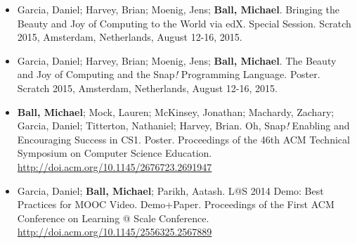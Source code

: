 \begin{itemize}
    \item{Garcia, Daniel; Harvey, Brian; Moenig, Jens; \textbf{Ball, Michael}. Bringing the Beauty and Joy of Computing to the World via edX. Special Session. Scratch 2015, Amsterdam, Netherlands, August 12-16, 2015.}

    \item{Garcia, Daniel; Harvey, Brian; Moenig, Jens; \textbf{Ball, Michael}. The Beauty and Joy of Computing and the Snap\textit{!} Programming Language. Poster. Scratch 2015, Amsterdam, Netherlands, August 12-16, 2015.}

    \item{\textbf{Ball, Michael}; Mock, Lauren; McKinsey, Jonathan; Machardy, Zachary; Garcia, Daniel; Titterton, Nathaniel; Harvey, Brian. Oh, Snap\textit{!} Enabling and Encouraging Success in CS1. Poster. Proceedings of the 46th ACM Technical Symposium on Computer Science Education.} \newline\href{http://doi.acm.org/10.1145/2676723.2691947}{http://doi.acm.org/10.1145/2676723.2691947}
    

    \item{Garcia, Daniel; \textbf{Ball, Michael}; Parikh, Aatash. L@S 2014 Demo: Best Practices for MOOC Video. Demo+Paper. Proceedings of the First ACM Conference on Learning @ Scale Conference.} \href{http://doi.acm.org/10.1145/2556325.2567889}{http://doi.acm.org/10.1145/2556325.2567889}

\end{itemize}
